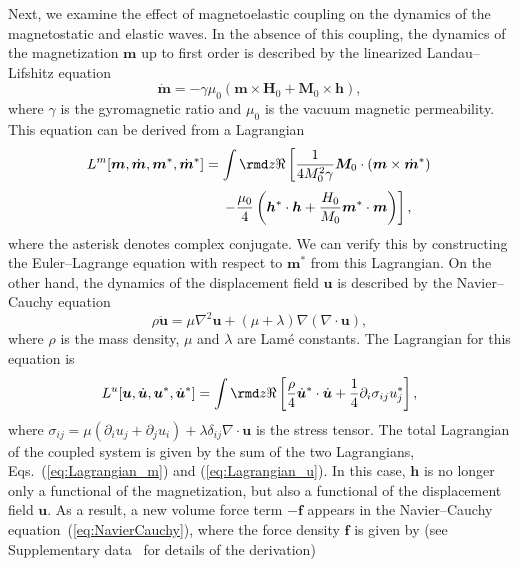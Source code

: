 \documentclass[10pt]{iopart}
\begin{document}
Next, we examine the effect of magnetoelastic coupling on the dynamics of the magnetostatic and elastic waves. In the absence of this coupling, the dynamics of the magnetization $\bm{m}$ up to first order is described by the linearized Landau--Lifshitz equation
\begin{equation}
    \dot{\bm{m}}=-\gamma\mu_0\left(\bm{m}\times\bm{H}_0+\bm{M}_0\times\bm{h}\right),\label{eq:LandauLifshitz}
\end{equation}
where $\gamma$ is the gyromagnetic ratio and $\mu_0$ is the vacuum magnetic permeability. This equation can be derived from a Lagrangian
\begin{equation*}
    L^m[\bm{m},\dot{\bm{m}},\bm{m}^*,\dot{\bm{m}}^*]=\int\rmd z\Re\left[\frac{1}{4M_0^2\gamma}\bm{M}_0\cdot(\bm{m}\times\dot{\bm{m}}^*)\right.
\end{equation*}
\begin{equation}
    \hspace{2.9cm}\left.-\frac{\mu_0}{4}\left(\bm{h}^*\cdot\bm{h}+\frac{H_0}{M_0}\bm{m}^*\cdot\bm{m}\right)\right],\label{eq:Lagrangian_m}
\end{equation}
where the asterisk denotes complex conjugate. We can verify this by constructing the Euler--Lagrange equation with respect to $\bm{m}^*$ from this Lagrangian. On the other hand, the dynamics of the displacement field $\bm{u}$ is described by the Navier--Cauchy equation
\begin{equation}
    \rho\ddot{\bm{u}}=\mu\nabla^2\bm{u}+\left(\mu+\lambda\right)\nabla\left(\nabla\cdot\bm{u}\right),\label{eq:NavierCauchy}
\end{equation}
where $\rho$ is the mass density, $\mu$ and $\lambda$ are Lam\'e constants. The Lagrangian for this equation is
\begin{equation}
    L^u[\bm{u},\dot{\bm{u}},\bm{u}^*,\dot{\bm{u}}^*]=\int\rmd z\Re\left[\frac{\rho}{4}\dot{\bm{u}}^*\cdot\dot{\bm{u}}+\frac{1}{4}\partial_i\sigma_{ij}u_j^*\right],\label{eq:Lagrangian_u}
\end{equation}
where $\sigma_{ij}=\mu(\partial_i u_j+\partial_j u_i)+\lambda\delta_{ij}\nabla\cdot\bm{u}$ is the stress tensor. The total Lagrangian of the coupled system is given by the sum of the two Lagrangians, Eqs.~(\ref{eq:Lagrangian_m}) and (\ref{eq:Lagrangian_u}). In this case, $\bm{h}$ is no longer only a functional of the magnetization, but also a functional of the displacement field $\bm{u}$. As a result, a new volume force term $-\bm{f}$ appears in the Navier--Cauchy equation~(\ref{eq:NavierCauchy}), where the force density $\bm{f}$ is given by (see Supplementary data~\cite{SM} for details of the derivation)
\end{document}
